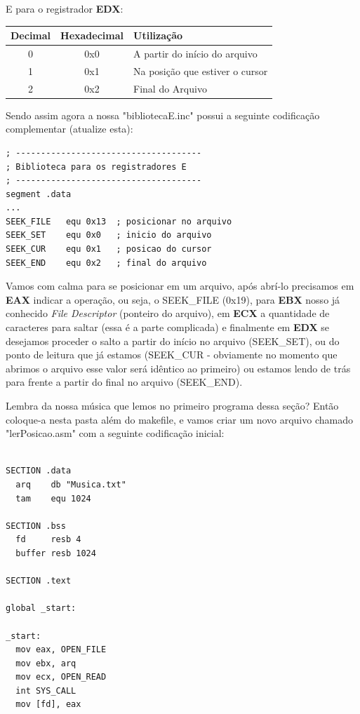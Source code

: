 E para o registrador \textbf{EDX}:
\begin{table}[H]
	\centering 
	\begin{tabular}{c | c | l }
		\textbf{Decimal} & \textbf{Hexadecimal} & \textbf{Utilização} \\ \hline 
		0 & 0x0 & A partir do início do arquivo \\
		1 & 0x1 & Na posição que estiver o cursor \\
		2 & 0x2 & Final do Arquivo
	\end{tabular}
\end{table}

Sendo assim agora a nossa "bibliotecaE.inc" possui a seguinte codificação complementar (atualize esta):
\begin{lstlisting}[]
; -------------------------------------
; Biblioteca para os registradores E
; -------------------------------------
segment .data
...
SEEK_FILE   equ 0x13  ; posicionar no arquivo
SEEK_SET    equ 0x0   ; inicio do arquivo
SEEK_CUR    equ 0x1   ; posicao do cursor
SEEK_END    equ 0x2   ; final do arquivo	
\end{lstlisting}	

Vamos com calma para se posicionar em um arquivo, após abrí-lo precisamos em \textbf{EAX} indicar a operação, ou seja, o SEEK\_FILE (0x19), para \textbf{EBX} nosso já conhecido \textit{File Descriptor} (ponteiro do arquivo), em \textbf{ECX} a quantidade de caracteres para saltar (essa é a parte complicada) e finalmente em \textbf{EDX} se desejamos proceder o salto a partir do início no arquivo (SEEK\_SET), ou do ponto de leitura que já estamos (SEEK\_CUR - obviamente no momento que abrimos o arquivo esse valor será idêntico ao primeiro) ou estamos lendo de trás para frente a partir do final no arquivo (SEEK\_END).

Lembra da nossa música que lemos no primeiro programa dessa seção? Então coloque-a nesta pasta além do makefile, e vamos criar um novo arquivo chamado "lerPosicao.asm" com a seguinte codificação inicial:

\begin{lstlisting}[]
%include 'bibliotecaE.inc'

SECTION .data
  arq    db "Musica.txt"
  tam    equ 1024

SECTION .bss
  fd     resb 4
  buffer resb 1024

SECTION .text

global _start:

_start:
  mov eax, OPEN_FILE
  mov ebx, arq
  mov ecx, OPEN_READ
  int SYS_CALL
  mov [fd], eax
\end{lstlisting}	

